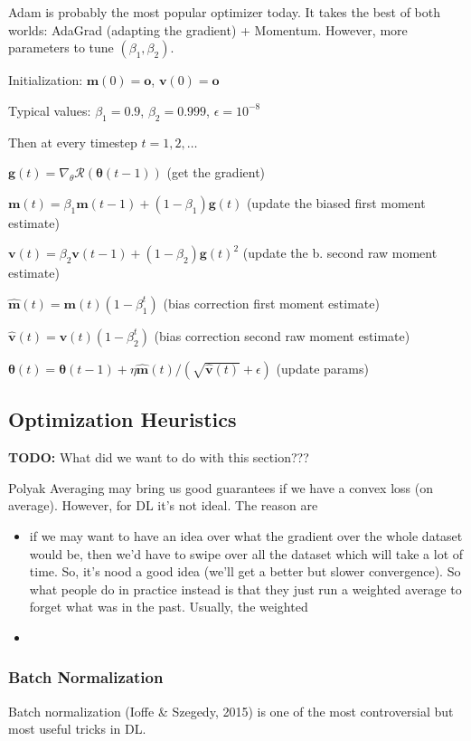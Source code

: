 \documentclass[a2paper,8pt]{extarticle}
\newcommand{\cR}{\mathcal{R}}
\renewcommand{\vec}[1]{\mathbf{#1}}
\newcommand{\vg}{\vec{g}}
\newcommand{\vm}{\vec{m}}
\newcommand{\vo}{\vec{o}}
\newcommand{\vv}{\vec{v}}
\newcommand{\vtheta}{\boldsymbol{\theta}}
\newcommand{\todo}[1]{\textbf{TODO:} #1}
\newcommand{\todo}[1]{%
}
\begin{document}
\begin{landscape}
\begin{multicols*}{7}
Adam is probably the most popular optimizer today. It takes the best of both
worlds: AdaGrad (adapting the gradient) + Momentum. However, more parameters to
tune $(\beta_1,\beta_2)$.

Initialization: $\vm(0)=\vo$, $\vv(0)=\vo$

Typical values: $\beta_1=0.9$, $\beta_2=0.999$, $\epsilon=10^{-8}$

Then at every timestep $t=1,2,\ldots$

$\vg(t)=\nabla_{\theta}\cR(\vtheta(t-1))$ (get the gradient)

$\vm(t)=\beta_1 \vm(t-1)+(1-\beta_1)\vg(t)$ (update the biased first moment
estimate)

$\vv(t)=\beta_2 \vv(t-1)+(1-\beta_2)\vg(t)^2$ (update the b. second raw moment
estimate)

$\hat{\vm}(t)=\vm(t)(1-\beta_1^t)$ (bias correction first moment estimate)

$\hat{\vv}(t)=\vv(t)(1-\beta_2^t)$ (bias correction second raw moment estimate)

$\vtheta(t)=\vtheta(t-1)+\eta\hat{\vm}(t)/(\sqrt{\hat{\vv}(t)}+\epsilon)$
(update params)

\subsection{Optimization Heuristics}

\todo{What did we want to do with this section???}

Polyak Averaging may bring us good guarantees if we have a convex loss (on
average). However, for DL it's not ideal. The reason are
\begin{itemize}
  \item if we may want to have an idea over what the gradient over the whole
  dataset would be, then we'd have to swipe over all the dataset which will take
  a lot of time. So, it's nood a good idea (we'll get a better but slower
  convergence). So what people do in practice instead is that they just run a
  weighted average to forget what was in the past. Usually, the weighted  
  \item 
\end{itemize} 

\subsubsection{Batch Normalization}

Batch normalization (Ioffe \& Szegedy, 2015) is one of the most controversial
but most useful tricks in DL. 


\end{multicols*}
\end{landscape}
\end{document}

